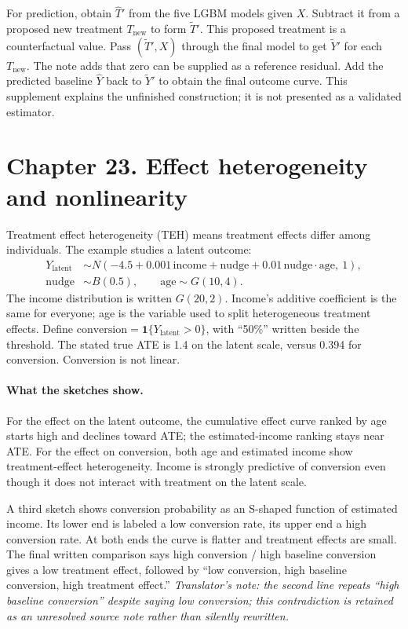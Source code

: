 For prediction, obtain $\hat T'$ from the five LGBM models given $X$. Subtract it from a proposed new treatment $T_{\mathrm{new}}$ to form $\widetilde T'$. This proposed treatment is a counterfactual value. Pass $(\widetilde T',X)$ through the final model to get $\widetilde Y'$ for each $T_{\mathrm{new}}$. The note adds that zero can be supplied as a reference residual. Add the predicted baseline $\hat Y$ back to $\widetilde Y'$ to obtain the final outcome curve. This supplement explains the unfinished construction; it is not presented as a validated estimator.

\section{Chapter 23. Effect heterogeneity and nonlinearity}
Treatment effect heterogeneity (TEH) means treatment effects differ among individuals. The example studies a latent outcome:
\begin{align*}
Y_{\mathrm{latent}}&\sim N(-4.5+0.001\,\mathrm{income}+\mathrm{nudge}
+0.01\,\mathrm{nudge}\cdot\mathrm{age},\ 1),\\
\mathrm{nudge}&\sim B(0.5),\qquad \mathrm{age}\sim G(10,4).
\end{align*}
The income distribution is written $G(20,2)$. Income's additive coefficient is the same for everyone; age is the variable used to split heterogeneous treatment effects. Define $\mathrm{conversion}=\mathbf1\{Y_{\mathrm{latent}}>0\}$, with ``50\%'' written beside the threshold. The stated true ATE is 1.4 on the latent scale, versus 0.394 for conversion. Conversion is not linear.

\paragraph{What the sketches show.}
For the effect on the latent outcome, the cumulative effect curve ranked by age starts high and declines toward ATE; the estimated-income ranking stays near ATE. For the effect on conversion, both age and estimated income show treatment-effect heterogeneity. Income is strongly predictive of conversion even though it does not interact with treatment on the latent scale.

A third sketch shows conversion probability as an S-shaped function of estimated income. Its lower end is labeled a low conversion rate, its upper end a high conversion rate. At both ends the curve is flatter and treatment effects are small. The final written comparison says high conversion / high baseline conversion gives a low treatment effect, followed by ``low conversion, high baseline conversion, high treatment effect.'' \textit{Translator's note: the second line repeats ``high baseline conversion'' despite saying low conversion; this contradiction is retained as an unresolved source note rather than silently rewritten.}

